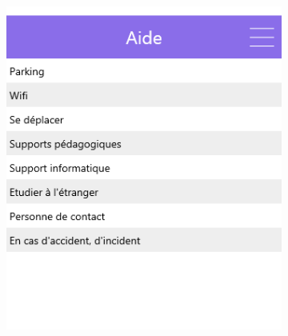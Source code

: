 \documentclass{eplmastersthesis}
\begin{document}
\begin{figure}[H]
\begin{subfigure}[b]{0.3\textwidth}
        \includegraphics[width=\textwidth]{Images/InVision/help-list.png}
    \end{subfigure}
\end{figure}
\end{document}
